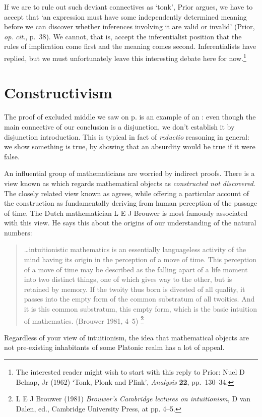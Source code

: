 If we are to rule out such deviant connectives as `tonk', Prior argues, we have to accept that  `an expression must have some independently determined meaning before we can discover whether inferences involving it are valid or invalid' (Prior, \emph{op}. \emph{cit}., p.\ 38). We cannot, that is, accept the inferentialist position that the rules of implication come first and the meaning comes second. Inferentialists have replied, but we must unfortunately leave this interesting debate here for now.\footnote{The interested reader might wish to start with this reply to Prior: Nuel D Belnap, Jr (1962) `Tonk, Plonk and Plink', \emph{Analysis} \textbf{22}, pp.\ 130–34.}

\section{Constructivism} \label{construct}

The proof of excluded middle we saw on p. \pageref{excmidd} is an example of an : even though the main connective of our conclusion is a disjunction, we don't establish it by disjunction introduction. This is typical in fact of \emph{reductio} reasoning in general: we show something is true, by showing that an absurdity would be true if it were false.

An influential group of mathematicians are worried by indirect proofs. There is a view known as  which regards mathematical objects as  \emph{constructed not discovered}. The closely related view known as  agrees, while offering a particular account of the construction as fundamentally deriving from human perception of the passage of time. The Dutch mathematician L E J Brouwer is most famously associated with this view. He says this about the origins of our understanding of the natural numbers: \begin{quote}
…intuitionistic mathematics is an essentially languageless activity of the mind having its origin in the perception of a move of time. This perception of a move of time may be described as the falling apart of a life moment into two distinct things, one of which gives way to the other, but is retained by memory. If the twoity thus born is divested of all quality, it passes into the empty form of the common substratum of all twoities. And it is this common substratum, this empty form, which is the basic intuition of mathematics. (Brouwer 1981, 4–5)	\footnote{L E J Brouwer (1981) \emph{Brouwer’s Cambridge lectures on intuitionism}, D van Dalen, ed., Cambridge University Press, at pp. 4–5.}
\end{quote} 
Regardless of your view of intuitionism, the idea that mathematical objects are not pre-existing inhabitants of some Platonic realm has a lot of appeal. 

